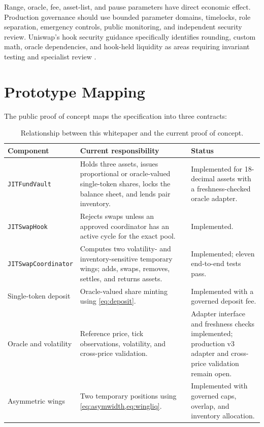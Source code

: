 \documentclass[11pt]{article}
\begin{document}
Range, oracle, fee, asset-list, and pause parameters have direct economic
effect. Production governance should use bounded parameter domains, timelocks,
role separation, emergency controls, public monitoring, and independent
security review. Uniswap's hook security guidance specifically identifies
rounding, custom math, oracle dependencies, and hook-held liquidity as areas
requiring invariant testing and specialist review \cite{univ4security}.

\section{Prototype Mapping}

The public proof of concept maps the specification into three contracts:

\begin{table}[ht]
\centering
\small
\begin{tabularx}{\textwidth}{@{}p{}X p{}@{}}
\toprule
Component & Current responsibility & Status \\
\midrule
\texttt{JITFundVault} & Holds three assets, issues proportional or
oracle-valued single-token shares, locks the balance sheet, and lends pair
inventory. & Implemented for 18-decimal assets with a freshness-checked oracle
adapter. \\
\texttt{JITSwapHook} & Rejects swaps unless an approved coordinator has an
active cycle for the exact pool. & Implemented. \\
\texttt{JITSwapCoordinator} & Computes two volatility- and inventory-sensitive
temporary wings; adds, swaps, removes, settles, and returns assets.
& Implemented; eleven end-to-end tests pass. \\
Single-token deposit & Oracle-valued share minting using
\cref{eq:deposit}. & Implemented with a governed deposit fee. \\
Oracle and volatility & Reference price, tick observations, volatility, and
cross-price validation. & Adapter interface and freshness checks implemented;
production v3 adapter and cross-price validation remain open. \\
Asymmetric wings & Two temporary positions using
\cref{eq:asymwidth,eq:wingliq}. & Implemented with governed caps, overlap, and
inventory allocation. \\
\bottomrule
\end{tabularx}
\caption{Relationship between this whitepaper and the current proof of concept.}
\label{tab:prototype}
\end{table}
\end{document}
